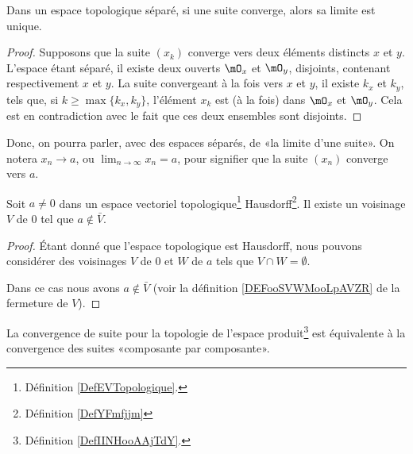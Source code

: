 \begin{proposition}\label{PropUniciteLimitePourSuites}
	Dans un espace topologique séparé, si une suite converge, alors sa limite est unique.
\end{proposition}
\begin{proof}
	Supposons que la suite \( (x_k)\) converge vers deux éléments distincts \( x \) et \( y \). L'espace étant séparé, il existe deux ouverts \( \mO_x \) et \( \mO_y \), disjoints, contenant respectivement \( x \) et \( y \). La suite convergeant à la fois vers \( x \) et \( y \), il existe \( k_x \) et \( k_y \), tels que, si \( k \geq \max\{k_x, k_y\} \), l'élément  \( x_k \) est (à la fois) dans  \( \mO_x \) et \( \mO_y \). Cela est en contradiction avec le fait que ces deux ensembles sont disjoints.
\end{proof}

\begin{normaltext}
	Donc, on pourra parler, avec des espaces séparés, de «la limite d'une suite». On notera \( x_n\to a\), ou \(\lim_{n\to \infty} x_n = a \), pour signifier que la suite \( (x_n) \) converge vers \( a \).
\end{normaltext}

\begin{lemma}        \label{LEMooMDTNooThlHJl}
	Soit \( a\neq 0\) dans un espace vectoriel topologique\footnote{Définition \ref{DefEVTopologique}.} Hausdorff\footnote{Définition \ref{DefYFmfjjm}}. Il existe un voisinage \( V\) de \( 0\) tel que \( a\notin \bar V\).
\end{lemma}

\begin{proof}
	Étant donné que l'espace topologique est Hausdorff, nous pouvons considérer des voisinages \( V\) de \( 0\) et \( W\) de \( a\) tels que \( V\cap W=\emptyset\).

	Dans ce cas nous avons \( a\notin \bar V\) (voir la définition \ref{DEFooSVWMooLpAVZR} de la fermeture de \( V\)).
\end{proof}

\begin{proposition}      \label{PROPooNRRIooCPesgO}
	La convergence de suite pour la topologie de l'espace produit\footnote{Définition \ref{DefIINHooAAjTdY}.} est équivalente à la convergence des suites «composante par composante».
\end{proposition}

